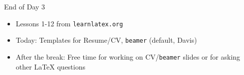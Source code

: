 \documentclass{beamer}
\begin{document}
{  \begin{frame}{End of Day 3}
    \begin{itemize}
      \item Lessons 1-12 from \texttt{learnlatex.org}
      \item Today: Templates for Resume/CV, \texttt{beamer} (default, Davis)
      \item After the break: Free time for working on CV/\texttt{beamer} slides or for asking other \LaTeX{} questions
    \end{itemize}
  \end{frame}

%   
%   

} %
\end{document}
